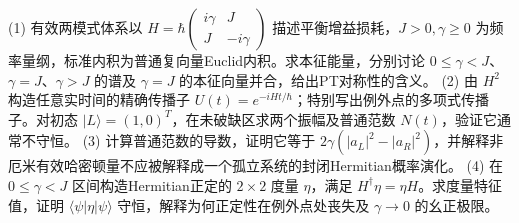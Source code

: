 (1) 有效两模式体系以 \(H=\hbar\begin{pmatrix}i\gamma&J\\J&-i\gamma\end{pmatrix}\) 描述平衡增益损耗，\(J>0,\gamma\ge0\) 为频率量纲，标准内积为普通复向量Euclid内积。求本征能量，分别讨论 \(0\le\gamma<J\)、\(\gamma=J\)、\(\gamma>J\) 的谱及 \(\gamma=J\) 的本征向量并合，给出PT对称性的含义。
(2) 由 \(H^2\) 构造任意实时间的精确传播子 \(U(t)=e^{-iHt/\hbar}\)；特别写出例外点的多项式传播子。对初态 \(|L\rangle=(1,0)^T\)，在未破缺区求两个振幅及普通范数 \(N(t)\)，验证它通常不守恒。
(3) 计算普通范数的导数，证明它等于 \(2\gamma(|a_L|^2-|a_R|^2)\)，并解释非厄米有效哈密顿量不应被解释成一个孤立系统的封闭Hermitian概率演化。
(4) 在 \(0\le\gamma<J\) 区间构造Hermitian正定的 \(2\times2\) 度量 \(\eta\)，满足 \(H^\dagger\eta=\eta H\)。求度量特征值，证明 \(\langle\psi|\eta|\psi\rangle\) 守恒，解释为何正定性在例外点处丧失及 \(\gamma\to0\) 的幺正极限。

